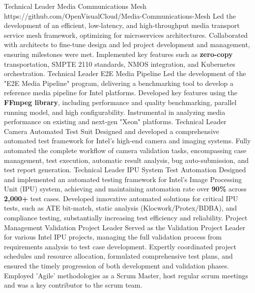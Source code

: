\documentclass[9pt]{developercv} %
\begin{document}
\begin{entrylist}
    \entry
    {Technical \newline Leader}
		{Media Communications Mesh}
		{https://github.com/OpenVisualCloud/Media-Communications-Mesh}
        {Led the development of an efficient, low-latency, and high-throughput media transport service mesh framework, optimizing for microservices architectures. Collaborated with architects to fine-tune design and led project development and management, ensuring milestones were met. Implemented key features such as \textbf{zero-copy} transportation, SMPTE 2110 standards, NMOS integration, and Kubernetes orchestration.}
    \entry
        {Technical \newline Leader}
		{E2E Media Pipeline}
		{}
		{Led the development of the "E2E Media Pipeline" program, delivering a benchmarking tool to develop a reference media pipeline for Intel platforms.
        Developed key features using the \textbf{FFmpeg library}, including performance and quality benchmarking, parallel running model, and high configurability.
        Instrumental in analyzing media performance on existing and next-gen "Xeon" platforms.}
	\entry
        {Technical \newline Leader}
		{Camera Automated Test Suit}
		{}
        {Designed and developed a comprehensive automated test framework for Intel's high-end camera and imaging systems.
        Fully automated the complete workflow of camera validation tasks, encompassing case management, test execution, automatic result analysis, bug auto-submission, and test report generation.}
    \entry
		{Technical \newline Leader}
		{IPU System Test Automation}
		{}
        {Designed and implemented an automated testing framework for Intel's Image Processing Unit (IPU) system,
        achieving and maintaining automation rate over \textbf{90\%} across \textbf{2,000+} test cases.
        Developed innovative automated solutions for critical IPU tests, such as ATE bit-match, static analysis (Klocwork/Protex/BDBA),
        and compliance testing, substantially increasing test efficiency and reliability.}
    \entry
		{Project \newline Management}
		{Validation Project Leader}
		{}
        {
        Served as the Validation Project Leader for various Intel IPU projects, managing the full validation
        process from requirements analysis to test case development.
        Expertly coordinated project schedules and resource allocation, formulated comprehensive test
        plans, and ensured the timely progression of both development and validation phases.
        Employed 'Agile' methodologies as a Scrum Master, host regular scrum meetings and was a key contributor to the scrum team.
        }
\end{entrylist}
\end{document}

